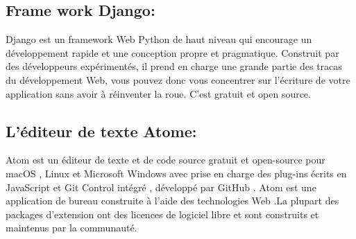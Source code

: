 \documentclass[a4paper]{report}
\begin{document}
\begin{doublespace}
\begin{doublespace}
\begin{doublespace}
\begin{doublespace}
\begin{doublespace}
                    \newpage

                    \subsection{Frame work Django:}
                    \begin{figure}[H]
                        \raggedleft{
                        }
                    \end{figure}
                    Django est un framework Web Python de haut niveau qui
                    encourage un développement rapide et une conception propre et pragmatique.
                    Construit par des développeurs expérimentés, il prend en charge une grande
                    partie des tracas du développement Web, vous pouvez donc vous concentrer sur
                    l'écriture de votre application sans avoir à réinventer la roue. C'est gratuit
                    et open source.

                    \subsection{L'éditeur de texte Atome:}
                    \begin{figure}[H]
                        \raggedleft{
                        }
                    \end{figure}
                    Atom est un éditeur de texte et de code source gratuit
                    et open-source pour macOS , Linux et Microsoft Windows avec prise en charge des
                    plug-ins écrits en JavaScript et Git Control intégré , développé par GitHub .
                    Atom est une application de bureau construite à l'aide des technologies Web .La
                    plupart des packages d'extension ont des licences de logiciel libre et sont
                    construits et maintenus par la communauté.
                    \newpage

\end{doublespace}
\end{doublespace}
\end{doublespace}
\end{doublespace}
\end{doublespace}
\end{document}
